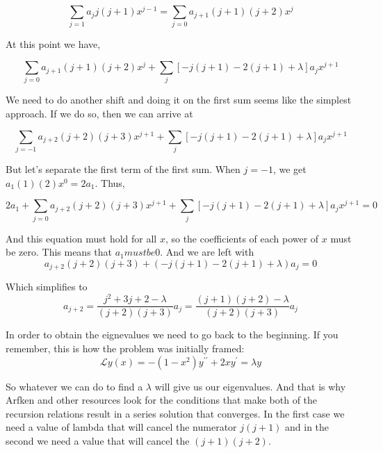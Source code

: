 $$
\sum_{j=1} a_j j(j+1) x^{j-1}
=
\sum_{j=0} a_{j+1} (j+1)(j+2) x^{j}
$$

At this point we have,

$$
\sum_{j=0} a_{j+1} (j+1)(j+2) x^{j}
    + \sum_j \left[ -j(j+1) -2(j+1) + \lambda \right] a_j x^{j+1}
$$

We need to do another shift and doing it on the first sum seems like the simplest approach.
If we do so, then we can arrive at

$$
\sum_{j=-1} a_{j+2} (j+2)(j+3) x^{j+1}
    + \sum_j \left[ -j(j+1) -2(j+1) + \lambda \right] a_j x^{j+1}
$$

But let's separate the first term of the first sum.
When $j=-1$, we get $a_1 (1)(2) x^0 = 2a_1$.
Thus,

$$
2 a_1 +
    \sum_{j=0} a_{j+2} (j+2)(j+3) x^{j+1}
    + \sum_j \left[ -j(j+1) -2(j+1) + \lambda \right] a_j x^{j+1} = 0
$$

And this equation must hold for all $x$, so the coefficients of each power of $x$ must be zero.
This means that $a_1 must be 0$.
And we are left with
$$
a_{j+2} (j+2)(j+3)
    + \left( -j(j+1) -2(j+1) + \lambda \right) a_j = 0
$$

Which simplifies to
$$
a_{j+2} = \frac{ j^2 + 3j + 2 - \lambda }{ (j+2)(j+3) } a_j
= \frac{ (j+1)(j+2) - \lambda }{ (j+2)(j+3) } a_j
$$

In order to obtain the eignevalues we need to go back to the beginning.
If you remember, this is how the problem was initially framed:
$$
\mathcal{L} y(x) =
-(1-x^2) y^{\prime\prime} + 2x y^\prime = \lambda y
$$

So whatever we can do to find a $\lambda$ will give us our eigenvalues.
And that is why Arfken and other resources look for the conditions that make both of the recursion relations result in
a series solution that converges.
In the first case we need a value of lambda that will cancel the numerator $j(j+1)$ and in the second we need a value that
will cancel the $(j+1)(j+2)$.
